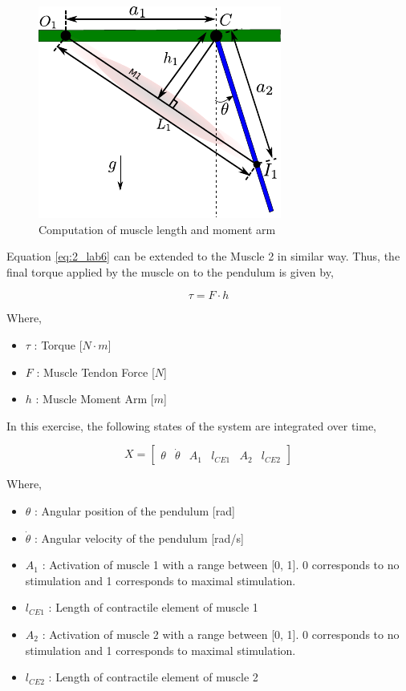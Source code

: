 \documentclass{cmc}
\begin{document}
\begin{figure}[H]
  \centering
  \includegraphics[scale=1]{figures/pendulum_muscles_force_length.pdf}
  \caption[force\_length]{Computation of muscle length and moment arm}
  \label{fig:pendulum_muscles_force_length}
\end{figure}

Equation \ref{eq:2_lab6} can be extended to the Muscle 2 in similar
way. Thus, the final torque applied by the muscle on to the pendulum
is given by,

\begin{equation}
  \label{eq:3}
  \tau = F \cdot h
\end{equation}

Where,

\begin{itemize}
\item $\tau$ : Torque [$N \cdot m$]
\item $F$ : Muscle Tendon Force [$N$]
\item $h$ : Muscle Moment Arm [$m$]

\end{itemize}

In this exercise, the following states of the system are integrated
over time,

\begin{equation}
  \label{eq:6_lab6}
  X = \begin{bmatrix}
    \theta & \dot{\theta} & A_1 & l_{CE1} & A_2 & l_{CE2}
  \end{bmatrix}
\end{equation}

Where,

\begin{itemize}
\item $\theta$ : Angular position of the pendulum [rad]
\item $\dot{\theta}$ : Angular velocity of the pendulum [rad/s]
\item $A_1$ : Activation of muscle 1 with a range between [0, 1].  0
  corresponds to no stimulation and 1 corresponds to maximal
  stimulation.
\item $l_{CE1}$ : Length of contractile element of muscle 1
\item $A_2$ : Activation of muscle 2 with a range between [0, 1].  0
  corresponds to no stimulation and 1 corresponds to maximal
  stimulation.
\item $l_{CE2}$ : Length of contractile element of muscle 2
\end{itemize}
\end{document}
